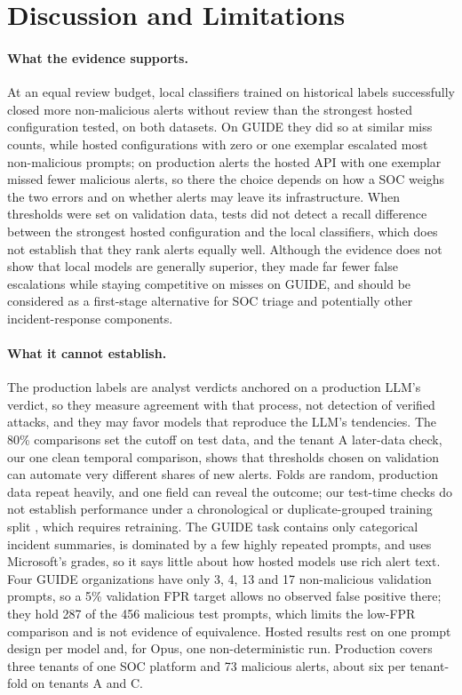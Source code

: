 \documentclass[letterpaper]{article} %
\begin{document}
\section{Discussion and Limitations}

\paragraph{What the evidence supports.} At an equal review budget, local classifiers trained on historical labels successfully closed more non-malicious alerts without review than the strongest hosted configuration tested, on both datasets. On GUIDE they did so at similar miss counts, while hosted configurations with zero or one exemplar escalated most non-malicious prompts; on production alerts the hosted API with one exemplar missed fewer malicious alerts, so there the choice depends on how a SOC weighs the two errors and on whether alerts may leave its infrastructure. When thresholds were set on validation data, tests did not detect a recall difference between the strongest hosted configuration and the local classifiers, which does not establish that they rank alerts equally well. Although the evidence does not show that local models are generally superior, they made far fewer false escalations while staying competitive on misses on GUIDE, and should be considered as a first-stage alternative for SOC triage and potentially other incident-response components.

\paragraph{What it cannot establish.} The production labels are analyst verdicts anchored on a production LLM's verdict, so they measure agreement with that process, not detection of verified attacks, and they may favor models that reproduce the LLM's tendencies. The 80\% comparisons set the cutoff on test data, and the tenant A later-data check, our one clean temporal comparison, shows that thresholds chosen on validation can automate very different shares of new alerts. Folds are random, production data repeat heavily, and one field can reveal the outcome; our test-time checks do not establish performance under a chronological or duplicate-grouped training split \citep{arp2022dos,pendlebury2019tesseract}, which requires retraining. The GUIDE task contains only categorical incident summaries, is dominated by a few highly repeated prompts, and uses Microsoft's grades, so it says little about how hosted models use rich alert text. Four GUIDE organizations have only 3, 4, 13 and 17 non-malicious validation prompts, so a 5\% validation FPR target allows no observed false positive there; they hold 287 of the 456 malicious test prompts, which limits the low-FPR comparison and is not evidence of equivalence. Hosted results rest on one prompt design per model \citep{sclar2024prompt} and, for Opus, one non-deterministic run. Production covers three tenants of one SOC platform and 73 malicious alerts, about six per tenant-fold on tenants A and C.
\end{document}
